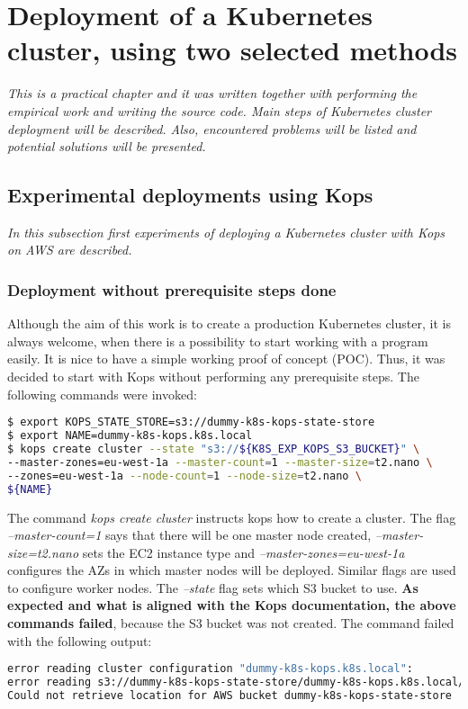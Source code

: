 \section{Deployment of a Kubernetes cluster, using two selected methods}
\textit{This is a practical chapter and it was written together with performing the empirical work and writing the source code. Main steps of Kubernetes cluster deployment will be described. Also, encountered problems will be listed and potential solutions will be presented.}
\\

\subsection{Experimental deployments using Kops}
\textit{In this subsection first experiments of deploying a Kubernetes cluster with Kops on AWS are described.}
\\

\subsubsection{Deployment without prerequisite steps done}

Although the aim of this work is to create a production Kubernetes cluster, it is always welcome, when there is a possibility to start working with a program easily. It is nice to have a simple working proof of concept (POC). Thus, it was decided to start with Kops without performing any prerequisite steps. The following commands were invoked:
\begin{lstlisting}[basicstyle=\tiny,caption={Commands used to create a cluster with kops, without prerequisite steps performed},captionpos=b,language=Bash,xleftmargin=1cm]
$ export KOPS_STATE_STORE=s3://dummy-k8s-kops-state-store
$ export NAME=dummy-k8s-kops.k8s.local
$ kops create cluster --state "s3://${K8S_EXP_KOPS_S3_BUCKET}" \
--master-zones=eu-west-1a --master-count=1 --master-size=t2.nano \
--zones=eu-west-1a --node-count=1 --node-size=t2.nano \
${NAME}
\end{lstlisting}


The command \textit{kops create cluster} instructs kops how to create a cluster. The flag \textit{--master-count=1} says that there will be one master node created, \textit{--master-size=t2.nano} sets the EC2 instance type and \textit{--master-zones=eu-west-1a} configures the AZs in which master nodes will be deployed. Similar flags are used to configure worker nodes. The \textit{--state} flag sets which S3 bucket to use.  \textbf{As expected and what is aligned with the Kops documentation\cite{online-kops-aws}, the above commands failed}, because the S3 bucket was not created. The command failed with the following output:
\begin{lstlisting}[basicstyle=\tiny,caption={Output of the commands used to create a cluster with Kops, without prerequisite steps performed},captionpos=b,language=Bash,xleftmargin=1cm]
error reading cluster configuration "dummy-k8s-kops.k8s.local":
error reading s3://dummy-k8s-kops-state-store/dummy-k8s-kops.k8s.local/config:
Could not retrieve location for AWS bucket dummy-k8s-kops-state-store
\end{lstlisting}

